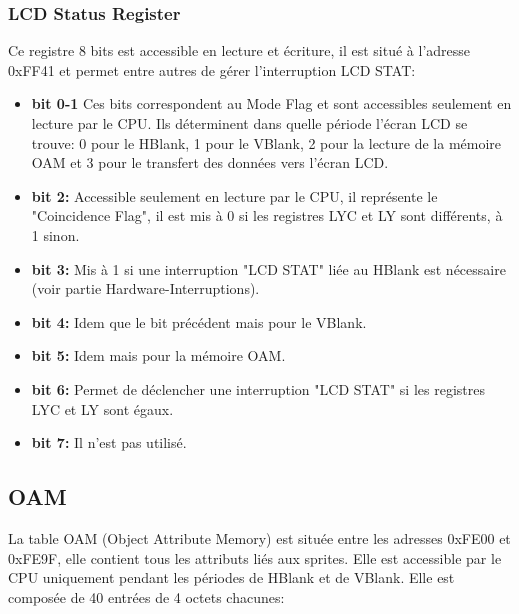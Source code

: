 \documentclass{report}
\begin{document}
\subsubsection{LCD Status Register}
Ce registre 8 bits est accessible en lecture et écriture, il est situé à l'adresse 0xFF41 et permet entre autres de gérer l'interruption LCD STAT:\\

\begin{itemize}
\item \textbf{bit 0-1}
	Ces bits correspondent au Mode Flag et sont accessibles seulement en lecture par le CPU. Ils déterminent dans quelle période l'écran LCD se trouve: 0 pour le HBlank, 1 pour le VBlank, 2 pour la lecture de la mémoire OAM et 3 pour le transfert des données vers l'écran LCD.\\
\item \textbf{bit 2:}
	Accessible seulement en lecture par le CPU, il représente le "Coincidence Flag", il est mis à 0 si les registres LYC et LY sont différents, à 1 sinon.\\
\item \textbf{bit 3:}
	Mis à 1 si une interruption "LCD STAT" liée au HBlank est nécessaire (voir partie Hardware-Interruptions).\\
\item \textbf{bit 4:} 
	Idem que le bit précédent mais pour le VBlank.\\
\item \textbf{bit 5:}
	Idem mais pour la mémoire OAM.\\
\item \textbf{bit 6:}
	Permet de déclencher une interruption "LCD STAT" si les registres LYC et LY sont égaux.\\
\item \textbf{bit 7:}
	Il n'est pas utilisé.\\
\end{itemize}

\subsection{OAM}
	La table OAM (Object Attribute Memory) est située entre les adresses 0xFE00 et 0xFE9F, elle contient tous les attributs liés aux sprites. Elle est accessible par le CPU uniquement pendant les périodes de HBlank et de VBlank. Elle est composée de 40 entrées de 4 octets chacunes:\\
\end{document}
